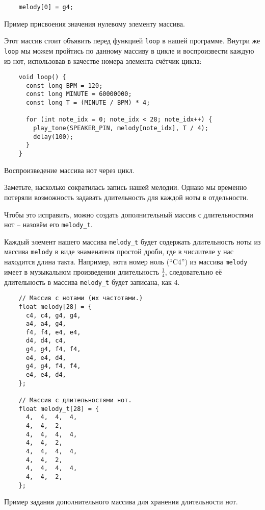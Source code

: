 \documentclass[../sparc.tex]{subfiles}
\begin{document}
\begin{listing}[ht]
  \begin{verbatim}
    melody[0] = g4;
  \end{verbatim}
  \label{listing:music-array-example-2}
  \caption{Пример присвоения значения нулевому элементу массива.}
\end{listing}

Этот массив стоит объявить перед функцией \texttt{loop} в нашей программе.
Внутри же \texttt{loop} мы можем пройтись по данному массиву в цикле и
воспроизвести каждую из нот, использовав в качестве номера элемента счётчик
цикла:

\begin{listing}[ht]
  \begin{verbatim}
    void loop() {
      const long BPM = 120;
      const long MINUTE = 60000000;
      const long T = (MINUTE / BPM) * 4;

      for (int note_idx = 0; note_idx < 28; note_idx++) {
        play_tone(SPEAKER_PIN, melody[note_idx], T / 4);
        delay(100);
      }
    }
  \end{verbatim}
  \label{listing:music-array-example-3}
  \caption{Воспроизведение массива нот через цикл.}
\end{listing}

Заметьте, насколько сократилась запись нашей мелодии. Однако мы временно
потеряли возможность задавать длительность для каждой ноты в отдельности.

Чтобы это исправить, можно создать дополнительный массив с длительностями нот --
назовём его \texttt{melody\_t}.

Каждый элемент нашего массива \texttt{melody\_t} будет содержать длительность
ноты из массива \texttt{melody} в виде знаменателя простой дроби, где в
числителе у нас находится длина такта. Например, нота номер ноль (``C4'') из
массива \texttt{melody} имеет в музыкальном произведении длительность
$\frac{1}{4}$, следовательно её длительность в массива \texttt{melody\_t} будет
записана, как 4.

\begin{listing}[ht]
  \begin{verbatim}
    // Массив с нотами (их частотами.)
    float melody[28] = {
      c4, c4, g4, g4,
      a4, a4, g4,
      f4, f4, e4, e4,
      d4, d4, c4,
      g4, g4, f4, f4,
      e4, e4, d4,
      g4, g4, f4, f4,
      e4, e4, d4,
    };

    // Массив с длительностями нот.
    float melody_t[28] = {
      4,  4,  4,  4,
      4,  4,  2,
      4,  4,  4,  4,
      4,  4,  2,
      4,  4,  4,  4,
      4,  4,  2,
      4,  4,  4,  4,
      4,  4,  2,
    };
  \end{verbatim}
  \label{listing:music-array-example-4}
  \caption{Пример задания дополнительного массива для хранения длительности
    нот.}
\end{listing}
\end{document}
